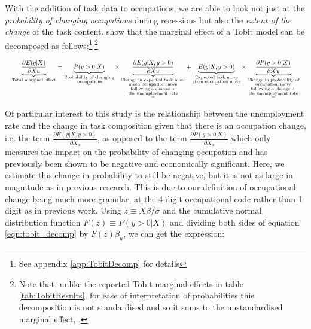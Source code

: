 \documentclass[11pt, oneside]{article}
\begin{document}
\doublespacing

With the addition of task data to occupations, we are able to look not just at the \textit{probability of changing occupations} during recessions but also the \textit{extent of the change} of the task content. \cite{Mcdonald1980} show that the marginal effect of a Tobit model can be decomposed as follows:\footnote{See appendix \ref{app:TobitDecomp} for details}$^{,}$\footnote{Note that, unlike the reported Tobit marginal effects in table \ref{tab:TobitResults}, for ease of interpretation of probabilities this decomposition is not standardised and so it sums to the unstandardised marginal effect, \hspace{-1mm}.}


\begin{equation}
\resizebox{\columnwidth}{!}{$\displaystyle
	\label{eqn:tobit_decomp}
	\underbrace{\frac{\partial E(y| X)}{\partial Xu}}_{\text{Total marginal effect}} = \underbrace{P(y>0|X)}_{\substack{\text{Probability of changing} \\ \text{ occupations}\\=}}\times\underbrace{\frac{\partial E(y|X, y>0)}{\partial Xu}}_{\substack{\text{Change in expected task move} \\ \text{given occupation move} \\ \text{following a change in} \\ \text{the unemployment rate} \\ =}} + \underbrace{ E(y|X, y>0)}_{\substack{\text{Expected task move} \\ \text{given occupation move}\\=}}\times \underbrace{\frac{\partial P(y>0|X)}{\partial Xu}}_{\substack{\text{Change in probability of} \\ \text{occupation move}  \\ \text{following a change in} \\ \text{the unemployment rate}\\=}}
	$}
\end{equation}


\vspace{3mm}
Of particular interest to this study is the relationship between the unemployment rate and the change in task composition given that there is an occupation change, i.e. the term $\frac{\partial E(y|X, y>0)}{\partial X_{u}}$, as opposed to the term $\frac{\partial P(y>0|X)}{\partial X_u}$ which only measures the impact on the probability of changing occupation and has previously been shown to be negative and economically significant. Here, we estimate this change in probability to still be negative, but it is not as large in magnitude as in previous research. This is due to our definition of occupational change being much more granular, at the 4-digit occupational code rather than 1-digit as in previous work.
Using $z \equiv X\beta/\sigma$ and the cumulative normal distribution function $F(z)\equiv P(y>0|X)$ and dividing both sides of equation \ref{eqn:tobit_decomp} by $F(z)\beta_{u}$, we can get the expression:
\end{document}
